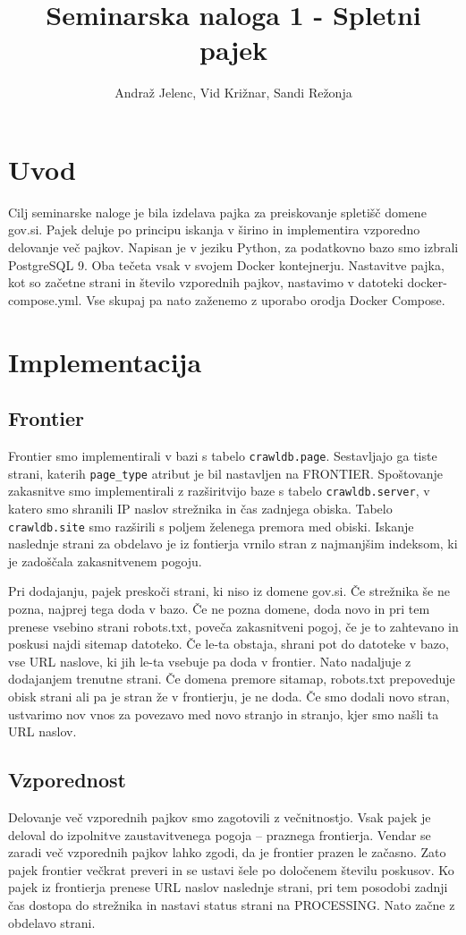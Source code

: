 \documentclass[a4paper,10pt]{paper}
\title{Seminarska naloga 1 - Spletni pajek\\\vspace{-1em}}
\author{Andraž Jelenc, Vid Križnar, Sandi Režonja}
\def\code#1{\texttt{#1}}
\begin{document}
\maketitle
\vspace{-3em}

\section{Uvod}
Cilj seminarske naloge je bila izdelava pajka za preiskovanje spletišč domene gov.si. Pajek deluje po principu iskanja v širino in implementira vzporedno delovanje več pajkov.
Napisan je v jeziku Python, za podatkovno bazo smo izbrali PostgreSQL 9. Oba tečeta vsak v svojem Docker kontejnerju. Nastavitve pajka, kot so začetne strani in število vzporednih pajkov, nastavimo v datoteki docker-compose.yml. Vse skupaj pa nato zaženemo z uporabo orodja Docker Compose.
\section{Implementacija}


\subsection{Frontier}
Frontier smo implementirali v bazi s tabelo \code{crawldb.page}. Sestavljajo ga tiste strani, katerih \code{page\_type} atribut je bil nastavljen na FRONTIER. Spoštovanje zakasnitve smo implementirali z razširitvijo baze s tabelo \code{crawldb.server}, v katero smo shranili IP naslov strežnika in čas zadnjega obiska. Tabelo \code{crawldb.site} smo razširili s poljem želenega premora med obiski. Iskanje naslednje strani za obdelavo je iz fontierja vrnilo stran z najmanjšim indeksom, ki je zadoščala zakasnitvenem pogoju.

Pri dodajanju, pajek preskoči strani, ki niso iz domene gov.si. Če strežnika še ne pozna, najprej tega doda v bazo. Če ne pozna domene, doda novo in pri tem prenese vsebino strani robots.txt, poveča zakasnitveni pogoj, če je to zahtevano in poskusi najdi sitemap datoteko. Če le-ta obstaja, shrani pot do datoteke v bazo, vse URL naslove, ki jih le-ta vsebuje pa doda v frontier. Nato nadaljuje z dodajanjem trenutne strani. Če domena premore sitamap, robots.txt prepoveduje obisk strani ali pa je stran že v frontierju, je ne doda. Če smo dodali novo stran, ustvarimo nov vnos za povezavo med novo stranjo in stranjo, kjer smo našli ta URL naslov.

\subsection{Vzporednost}
Delovanje več vzporednih pajkov smo zagotovili z večnitnostjo. Vsak pajek je deloval do izpolnitve zaustavitvenega pogoja – praznega frontierja. Vendar se zaradi več vzporednih pajkov lahko zgodi, da je frontier prazen le začasno. Zato pajek frontier večkrat preveri in se ustavi šele po določenem številu poskusov. Ko pajek iz frontierja prenese URL naslov naslednje strani, pri tem posodobi zadnji čas dostopa do strežnika in nastavi status strani na PROCESSING. Nato začne z obdelavo strani.
\end{document}
